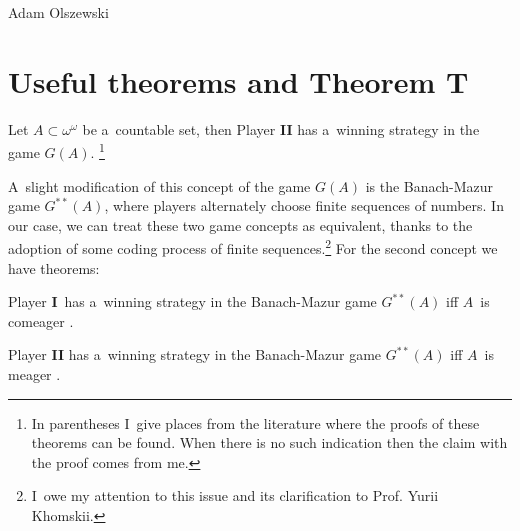 \begin{artengenv}{Adam Olszewski}
\section{Useful theorems and Theorem T}
\begin{theorem}\label{olsz71}
Let $A\subset\omega^{\omega}$ be a~countable set, then Player \textbf{II} has a~winning strategy in the game $G(A)$.
\emph{\parencite[][p.14]{khomskii_infinite_2010}}%
\footnote{In parentheses I~give places from the literature where the proofs of these theorems can be found. When there is no such indication then the claim with the proof comes from me.}
\end{theorem}

A~slight modification of this concept of the game $G(A)$ is the Banach-Mazur game $G^{**}(A)$, where players alternately choose finite sequences of numbers. In our case, we can treat these two game concepts as equivalent, thanks to the adoption of some coding process of finite sequences.\footnote{I~owe my attention to this issue and its clarification to Prof. Yurii Khomskii.} For the second concept we have theorems:

\begin{theorem}
Player \textbf{I}~has a~winning strategy in the Banach-Mazur game $G^{**}(A)$ iff $A$~is comeager
\emph{\parencite[][p.213]{soare_turing_2016}}.%
\end{theorem}

\begin{proposition}
Player \textbf{II} has a~winning strategy in the Banach-Mazur game $G^{**}(A)$ iff $A$~is meager
\emph{\parencite[][p.213]{soare_turing_2016}}.%
\end{proposition}



\end{artengenv}
